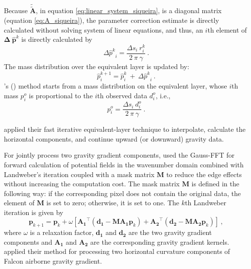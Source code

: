 Because $\mathbf{\tilde{\tilde{A}}}$,  in equation \ref{eq:linear_system_siqueira}, is a diagonal matrix 
(equation \ref{eq:A_siqueira}), the parameter correction estimate is directly calculated  without solving system of linear equations, and thus, an $i$th element of ${{\mathbf{\Delta \: \hat{p}}} }^{k}$  
is directly calculated by
\begin{equation}
	{{\Delta \hat{p}}^{k}}_{i} = \frac{{\Delta s}_{i} \: r^{k}_{i} } 
	{2\: \pi \: \gamma}   \: .
	\label{eq:deltap_siqueira}
\end{equation}
The mass distribution over the equivalent layer is updated by: 
\begin{equation}
	{\hat{p}}^{k+1}_{i} = {\hat{p}}^{k}_{i} \: + \: {{\Delta \hat{p}}^{k}}_{i} \: .
	\label{eq:p_siqueira}
\end{equation}
\citeauthor{siqueira-etal2017}'s (\citeyear{siqueira-etal2017}) method starts from a mass distribution 
on the equivalent layer, whose $i$th mass $p^{o}_{i}$ is proportional to the $i$th 
observed data $d^{o}_{i}$, i.e.,
\begin{equation}
	p^{o}_{i} = \frac{{\Delta s}_{i} \: d^{o}_{i} }{2\: \pi \: \gamma}   \: .
	\label{eq:po_siqueira}
\end{equation}

\cite{siqueira-etal2017} applied their fast iterative equivalent-layer 
technique to interpolate, calculate the horizontal components, and
continue upward (or downward) gravity data.

For jointly process two gravity gradient components, 
\cite{jirigalatu-ebbing2019} used the Gauss-FFT for forward calculation of potential fields in the wavenumber domain combined with Landweber's iteration coupled with a mask matrix $\mathbf{M}$ to reduce the edge effects without increasing the computation cost.
The  mask matrix $\mathbf{M}$ is defined in the following way:
if the corresponding pixel does not contain the original data, 
the element of  $\mathbf{M}$ is set to zero; otherwise, it is set to one.
The $k$th Landweber iteration is given by
\begin{equation}
	\mathbf{p}_{k+1} =	\mathbf{p}_{k} + \omega
	\left[ \mathbf{A_1}^{\top} (\mathbf{d_1} - 
	\mathbf{M} \mathbf{A_1}	\mathbf{p}_{k}) +
	\mathbf{A_2}^{\top} (\mathbf{d_2} - 
	\mathbf{M} \mathbf{A_2}	\mathbf{p}_{k}) \right]	 \:,
	\label{eq:p_jirigalatu-ebbing2019}
\end{equation}
where $\omega$ is a relaxation factor, $\mathbf{d_1}$ and $\mathbf{d_2}$
are the two gravity gradient components and $\mathbf{A_1}$ and  
$ \mathbf{A_2}$ are the corresponding gravity gradient kernels.
\cite{jirigalatu-ebbing2019} applied their method for processing
two horizontal curvature components of Falcon airborne gravity gradient.

